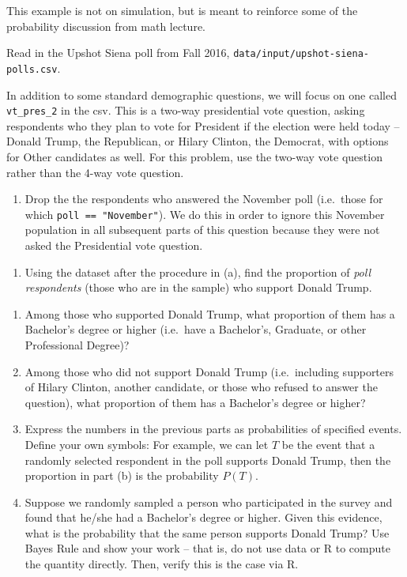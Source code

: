 \documentclass[
  letterpaper,
]{book}
\providecommand{\tightlist}{%
  \setlength{\itemsep}{0pt}\setlength{\parskip}{0pt}}\usepackage{longtable,booktabs,array}
\theoremstyle{definition}
\theoremstyle{definition}
\theoremstyle{plain}
\theoremstyle{definition}
\theoremstyle{plain}
\theoremstyle{plain}
\theoremstyle{remark}
\begin{document}
This example is not on simulation, but is meant to reinforce some of the
probability discussion from math lecture.

Read in the Upshot Siena poll from Fall 2016,
\texttt{data/input/upshot-siena-polls.csv}.

In addition to some standard demographic questions, we will focus on one
called \texttt{vt\_pres\_2} in the csv. This is a two-way presidential
vote question, asking respondents who they plan to vote for President if
the election were held today -- Donald Trump, the Republican, or Hilary
Clinton, the Democrat, with options for Other candidates as well. For
this problem, use the two-way vote question rather than the 4-way vote
question.

\begin{enumerate}
\def\labelenumi{(\alph{enumi})}
\tightlist
\item
  Drop the the respondents who answered the November poll (i.e.~those
  for which \texttt{poll\ ==\ "November"}). We do this in order to
  ignore this November population in all subsequent parts of this
  question because they were not asked the Presidential vote question.
\end{enumerate}

\begin{enumerate}
\def\labelenumi{(\alph{enumi})}
\setcounter{enumi}{1}
\tightlist
\item
  Using the dataset after the procedure in (a), find the proportion of
  \emph{poll respondents} (those who are in the sample) who support
  Donald Trump.
\end{enumerate}

\begin{enumerate}
\def\labelenumi{(\alph{enumi})}
\setcounter{enumi}{2}
\item
  Among those who supported Donald Trump, what proportion of them has a
  Bachelor's degree or higher (i.e.~have a Bachelor's, Graduate, or
  other Professional Degree)?
\item
  Among those who did not support Donald Trump (i.e.~including
  supporters of Hilary Clinton, another candidate, or those who refused
  to answer the question), what proportion of them has a Bachelor's
  degree or higher?
\item
  Express the numbers in the previous parts as probabilities of
  specified events. Define your own symbols: For example, we can let
  \(T\) be the event that a randomly selected respondent in the poll
  supports Donald Trump, then the proportion in part (b) is the
  probability \(P(T).\)
\item
  Suppose we randomly sampled a person who participated in the survey
  and found that he/she had a Bachelor's degree or higher. Given this
  evidence, what is the probability that the same person supports Donald
  Trump? Use Bayes Rule and show your work -- that is, do not use data
  or R to compute the quantity directly. Then, verify this is the case
  via R.
\end{enumerate}
\end{document}
